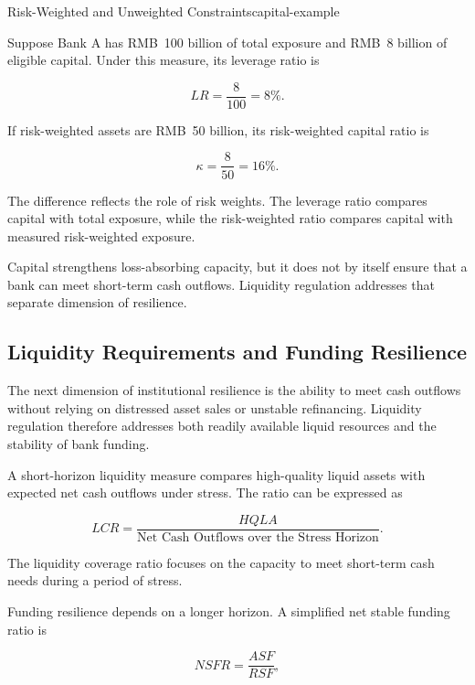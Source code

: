 \begin{example}{Risk-Weighted and Unweighted Constraints}{capital-example}

Suppose Bank A has RMB~100 billion of total exposure and RMB~8 billion of eligible capital. Under this measure, its leverage ratio is

$$
LR=\frac{8}{100}=8\%.
$$

If risk-weighted assets are RMB~50 billion, its risk-weighted capital ratio is

$$
\kappa=\frac{8}{50}=16\%.
$$

The difference reflects the role of risk weights. The leverage ratio compares capital with total exposure, while the risk-weighted ratio compares capital with measured risk-weighted exposure.

\end{example}

Capital strengthens loss-absorbing capacity, but it does not by itself ensure that a bank can meet short-term cash outflows. Liquidity regulation addresses that separate dimension of resilience.

\subsection{Liquidity Requirements and Funding Resilience}

The next dimension of institutional resilience is the ability to meet cash outflows without relying on distressed asset sales or unstable refinancing. Liquidity regulation therefore addresses both readily available liquid resources and the stability of bank funding.

A short-horizon liquidity measure compares high-quality liquid assets with expected net cash outflows under stress. The ratio can be expressed as

\begin{equation}
LCR
=\frac{HQLA}
{\text{Net Cash Outflows over the Stress Horizon}}.
\label{eq:ch23-lcr}
\end{equation}

The liquidity coverage ratio focuses on the capacity to meet short-term cash needs during a period of stress.

Funding resilience depends on a longer horizon. A simplified net stable funding ratio is

\begin{equation}
NSFR
=
\frac{ASF}{RSF},
\label{eq:ch23-nsfr}
\end{equation}

